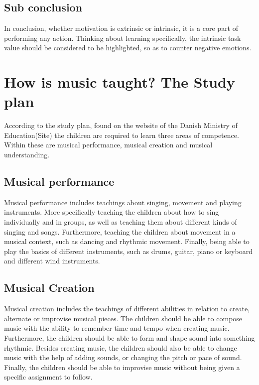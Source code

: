 \subsection*{Sub conclusion}
In conclusion, whether motivation is extrinsic or intrinsic, it is a core part of performing any action. Thinking about learning specifically, the intrinsic task value should be considered to be highlighted, so as to counter negative emotions.

\section{How is music taught? The Study plan}

According to the study plan, found on the website of the Danish Ministry of Education(Site) the children are required to learn three areas of competence. Within these are musical performance, musical creation and musical understanding.

\subsection*{Musical performance}
Musical performance includes teachings about singing, movement and playing instruments. More specifically teaching the children about how to sing individually and in groups, as well as teaching them about different kinds of singing and songs. Furthermore, teaching the children about movement in a musical context, such as dancing and rhythmic movement. Finally, being able to play the basics of different instruments, such as drums, guitar, piano or keyboard and different wind instruments.

\subsection*{Musical Creation}
Musical creation includes the teachings of different abilities in relation to create, alternate or improvise musical pieces. The children should be able to compose music with the ability to remember time and tempo when creating music. Furthermore, the children should be able to form and shape sound into something rhythmic. Besides creating music, the children should also be able to change music with the help of adding sounds, or changing the pitch or pace of sound. Finally, the children should be able to improvise music without being given a specific assignment to follow.

